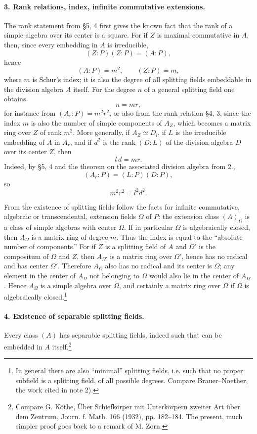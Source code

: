 \documentclass[11pt]{article}
\begin{document}
\paragraph{3. Rank relations, index, infinite commutative extensions.}
The rank statement from §5, 4 first gives the known fact that the rank of a simple algebra over its center is a square. For if \(Z\) is maximal commutative in \(A\), then, since every embedding in \(A\) is irreducible,
\[
        (Z:P)(Z:P)=(A:P),
\]
hence
\[
        (A:P)=m^2,\qquad (Z:P)=m,
\]
where \(m\) is Schur's index; it is also the degree of all splitting fields embeddable in the division algebra \(A\) itself. For the degree \(n\) of a general splitting field one obtains
\[
        n=mr,
\]
for instance from \((A_r:P)=m^2r^2\), or also from the rank relation §4, 3, since the index \(m\) is also the number of simple components of \(A_Z\), which becomes a matrix ring over \(Z\) of rank \(m^2\). More generally, if \(A_Z\simeq D_l\), if \(L\) is the irreducible embedding of \(A\) in \(A_r\), and if \(d^2\) is the rank \((D:L)\) of the division algebra \(D\) over its center \(Z\), then
\[
        l\,d=mr .
\]
Indeed, by §5, 4 and the theorem on the associated division algebra from 2.,
\[
        (A_r:P)=(L:P)(D:P),
\]
so
\[
        m^2r^2=l^2d^2 .
\]

From the existence of splitting fields follow the facts for infinite commutative, algebraic or transcendental, extension fields \(\Omega\) of \(P\): the extension class \((A)_\Omega\) is a class of simple algebras with center \(\Omega\). If in particular \(\Omega\) is algebraically closed, then \(A_\Omega\) is a matrix ring of degree \(m\). Thus the index is equal to the “absolute number of components.” For if \(Z\) is a splitting field of \(A\) and \(\Omega'\) is the compositum of \(\Omega\) and \(Z\), then \(A_{\Omega'}\) is a matrix ring over \(\Omega'\), hence has no radical and has center \(\Omega'\). Therefore \(A_\Omega\) also has no radical and its center is \(\Omega\); any element in the center of \(A_\Omega\) not belonging to \(\Omega\) would also lie in the center of \(A_{\Omega'}\). Hence \(A_\Omega\) is a simple algebra over \(\Omega\), and certainly a matrix ring over \(\Omega\) if \(\Omega\) is algebraically closed.\footnote{In general there are also “minimal” splitting fields, i.e. such that no proper subfield is a splitting field, of all possible degrees. Compare Brauer--Noether, the work cited in note 2).}

\paragraph{4. Existence of separable splitting fields.}
Every class \((A)\) has separable splitting fields, indeed such that can be embedded in \(A\) itself.\footnote{Compare G. Köthe, Über Schiefkörper mit Unterkörpern zweiter Art über dem Zentrum, Journ. f. Math. 166 (1932), pp. 182--184. The present, much simpler proof goes back to a remark of M. Zorn.}
\end{document}
